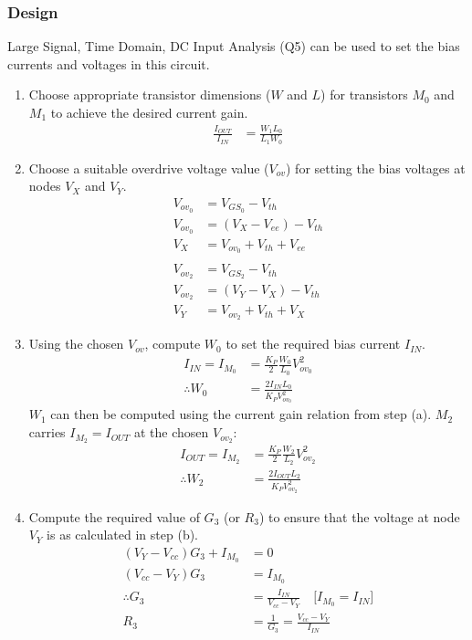\subsubsection{Design}
Large Signal, Time Domain, DC Input Analysis (Q5) can be used to set the bias
currents and voltages in this circuit.
\begin{enumerate}
  \item Choose appropriate transistor dimensions
    ($W$ and $L$) for transistors $M_0$ and $M_1$
    to achieve the desired current gain.
    \begin{align*}
      \frac{I_{OUT}}{I_{IN}} &= \frac{W_1 L_0}{L_1 W_0}
    \end{align*}
  \item Choose a suitable overdrive voltage value
    ($V_{ov}$) for setting the bias voltages at
    nodes $V_{X}$ and $V_{Y}$.
    \begin{align*}
      V_{ov_0} &= V_{GS_0} - V_{th} \\
      V_{ov_0} &= (V_{X} - V_{ee}) - V_{th} \\
      V_{X} &= V_{ov_0} + V_{th} + V_{ee} \\
      \\
      V_{ov_2} &= V_{GS_2} - V_{th} \\
      V_{ov_2} &= (V_{Y} - V_{X}) - V_{th} \\
      V_{Y} &= V_{ov_2} + V_{th} + V_{X}
    \end{align*}
  \item Using the chosen $V_{ov}$, compute $W_0$
    to set the required bias current $I_{IN}$.
    \begin{align*}
      I_{IN} = I_{M_0} &= \frac{K_P}{2} \frac{W_0}{L_0} V_{ov_0}^2 \\
      \therefore W_0 &= \frac{2 I_{IN} L_0}{K_P V_{ov_0}^2}
    \end{align*}
    $W_1$ can then be computed using the current
    gain relation from step (a). \(M_2\) carries \(I_{M_2} = I_{OUT}\)
    at the chosen \(V_{ov_2}\):
    \begin{align*}
      I_{OUT} = I_{M_2} &= \frac{K_P}{2} \frac{W_2}{L_2} V_{ov_2}^2 \\
      \therefore W_2 &= \frac{2 I_{OUT} L_2}{K_P V_{ov_2}^2}
    \end{align*}
  \item Compute the required value of $G_3$ (or
    $R_3$) to ensure that the voltage at node
    $V_{Y}$ is as calculated in step (b).
    \begin{align*}
      (V_{Y} - V_{cc})G_3 + I_{M_0} &= 0 \\
      (V_{cc} - V_{Y})G_3 &= I_{M_0} \\
      \therefore G_3 &= \frac{I_{IN}}{V_{cc} - V_{Y}} \quad \text{[}I_{M_0} = I_{IN} \text{]} \\
      R_3 &= \frac{1}{G_3} = \frac{V_{cc} - V_{Y}}{I_{IN}}
    \end{align*}
\end{enumerate}

